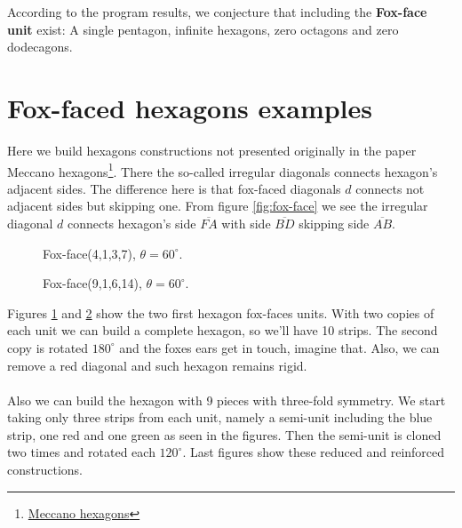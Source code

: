 \documentclass[11pt]{article}
\begin{document}
According to the program results, we conjecture that including the \textbf{Fox-face unit} exist: A single pentagon, infinite hexagons, zero octagons and zero dodecagons. 

\section{Fox-faced hexagons examples}

Here we build hexagons constructions not presented originally in the paper Meccano hexagons\footnote{
\href{https://github.com/heptagons/meccano/tree/main/hexa/hexagons.pdf}{Meccano hexagons}	
}. There the so-called irregular diagonals connects hexagon's adjacent sides. 
The difference here is that fox-faced diagonals $d$ connects not adjacent sides but skipping one. 
From figure \ref{fig:fox-face} we see the irregular diagonal $d$ connects hexagon's side $\overline{FA}$
with side $\overline{BD}$ skipping side $\overline{AB}$.

\setlength{\columnsep}{10pt}
\begin{multicols}{1}
\begin{figure}[H]
\centering
{}
\caption{Fox-face(4,1,3,7), $\theta=60^\circ$.}
\label{fig:4-1-3-7}
\end{figure}

\begin{figure}[H]
\centering
{}
\caption{Fox-face(9,1,6,14), $\theta=60^\circ$.}
\label{fig:9-1-6-14}
\end{figure}
\end{multicols}

Figures \ref{fig:4-1-3-7} and \ref{fig:9-1-6-14} show the two first hexagon fox-faces units. With 
two copies of each unit we can build a complete hexagon, so we'll have 10 strips. The second copy
is rotated $180^\circ$ and the foxes ears get in touch, imagine that. Also, we can remove a
red diagonal and such hexagon remains rigid.
\\\\
Also we can build the hexagon with 9 pieces with three-fold symmetry.
We start taking only three strips from each unit,
namely a semi-unit including the blue strip, one red and one green as seen in the figures.
Then the semi-unit is cloned two times and rotated each $120^\circ$.
Last figures show these reduced and reinforced constructions.
\end{document}
